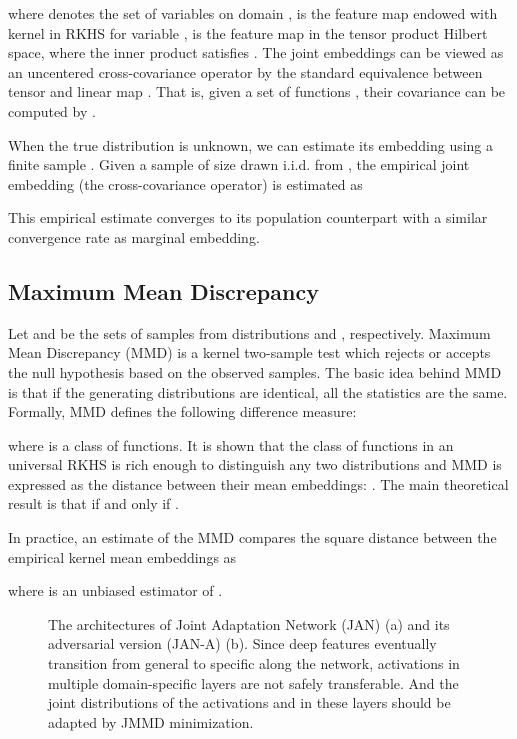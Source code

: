 \documentclass{article}
\begin{document}
where  denotes the set of  variables  on domain ,  is the feature map endowed with kernel  in RKHS  for variable ,  is the feature map in the tensor product Hilbert space, where the inner product satisfies . The joint embeddings can be viewed as an uncentered cross-covariance operator  by the standard equivalence between tensor and linear map \cite{cite:ICML10HSE}. That is, given a set of functions , their covariance can be computed by .

When the true distribution  is unknown, we can estimate
its embedding using a finite sample \cite{cite:IEEE13KSE}. Given a sample  of size  drawn i.i.d. from , the empirical joint embedding (the cross-covariance operator) is estimated as

This empirical estimate converges to its population counterpart with a similar convergence rate as marginal embedding.

\subsection{Maximum Mean Discrepancy}
Let  and  be the sets of samples from distributions  and , respectively. Maximum Mean Discrepancy (MMD) \cite{cite:JMLR12MMD} is a kernel two-sample test which rejects or accepts the null hypothesis  based on the observed samples. The basic idea behind MMD is that if the generating distributions are identical, all the statistics are the same. Formally, MMD defines the following difference measure:

where  is a class of functions. It is shown that the class of functions in an universal RKHS  is rich enough to distinguish any two distributions and MMD is expressed as the distance between their mean embeddings: . The main theoretical result is that  if and only if  \cite{cite:JMLR12MMD}. 

In practice, an estimate of the MMD compares the square distance between the empirical kernel mean embeddings as

where  is an unbiased estimator of .

\begin{figure*}[!htb]
  \centering
  \vspace{-10pt}
  \caption{The architectures of Joint Adaptation Network (JAN) (a) and its adversarial version (JAN-A) (b). Since deep features eventually transition from general to specific along the network, activations in multiple domain-specific layers  are not safely transferable. And the joint distributions of the activations   and  in these layers should be adapted by JMMD minimization.}
  \label{fig:JAN}
  \vspace{-10pt}
\end{figure*}
\end{document}
